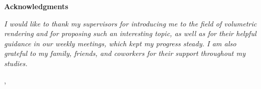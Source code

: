 \thispagestyle{empty}

\begin{center}
{\Large \textbf{\sc Acknowledgments}}
\end{center}
\vspace{0.5cm}

{\it\noindent
I would like to thank my supervisors for introducing me to the field of
volumetric rendering and for proposing such an interesting topic, as well as
for their helpful guidance in our weekly meetings, which kept my progress steady.
I am also grateful to my family, friends, and coworkers for their support
throughout my studies.

\vspace{0.5cm} \hfill \tauthor, \myyear
}